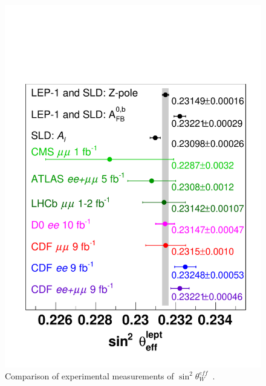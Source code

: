 \begin{figure}[p]
    \centering
    \includegraphics[height=0.3\textheight]{figures/ss-precision-summary-sin2thetaw.pdf}
    \caption{Comparison of experimental measurements of
$\sin^2\theta^{eff}_{W}$~\cite{Aaltonen:2016nuy}.}
    \label{fig:ss-precision-summary-sin2thetaw}
\end{figure}


